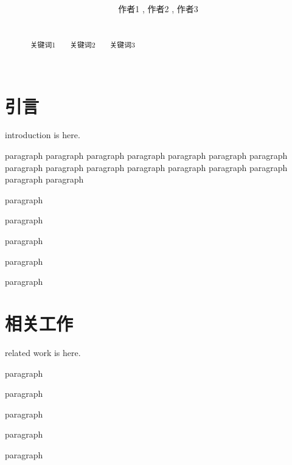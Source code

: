 \documentclass{ctexart}
\begin{document}
	\everymath{\displaystyle}%
	\abovedisplayshortskip=5pt%
	\belowdisplayshortskip=5pt
	\abovedisplayskip=5pt
	\belowdisplayskip=5pt
	\lineskiplimit=4pt
	\lineskip=4pt
	\title{ }%
	\date{}%
	\author[1]{作者1 , 作者2 , 作者3\vspace{-1em}}%

	\maketitle 
	\begin{abstract}
		\\
		~~~{\kaishu 关键词1~~~~关键词2~~~~关键词3}\\
		\\
	\end{abstract}

	\vspace{-2em}
	\section{引言}

	introduction is here.

	paragraph paragraph paragraph paragraph paragraph paragraph paragraph paragraph paragraph paragraph paragraph paragraph paragraph paragraph paragraph paragraph

	paragraph

	paragraph

	paragraph

	paragraph

	paragraph

	\section{相关工作}

	related work is here.

	paragraph

	paragraph

	paragraph

	paragraph

	paragraph
\end{document}
